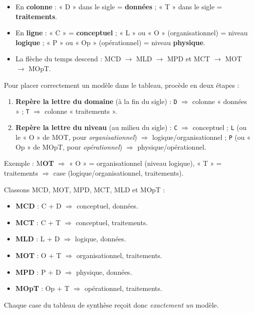 \documentclass[11pt]{article}
\begin{document}
\begin{aretenir}
\begin{itemize}
\item En \textbf{colonne} : « D » dans le sigle = \textbf{données} ; « T » dans le sigle = \textbf{traitements}.
\item En \textbf{ligne} : « C » = \textbf{conceptuel} ; « L » ou « O » (organisationnel) = niveau \textbf{logique} ; « P » ou « Op » (opérationnel) = niveau \textbf{physique}.
\item La flèche du temps descend : MCD $\rightarrow$ MLD $\rightarrow$ MPD et MCT $\rightarrow$ MOT $\rightarrow$ MOpT.
\end{itemize}
\end{aretenir}

\begin{methode}
Pour placer correctement un modèle dans le tableau, procède en deux étapes :
\begin{enumerate}
\item \textbf{Repère la lettre du domaine} (à la fin du sigle) : \texttt{D} $\Rightarrow$ colonne « données » ; \texttt{T} $\Rightarrow$ colonne « traitements ».
\item \textbf{Repère la lettre du niveau} (au milieu du sigle) : \texttt{C} $\Rightarrow$ conceptuel ; \texttt{L} (ou le « O » de MOT, pour \emph{organisationnel}) $\Rightarrow$ logique/organisationnel ; \texttt{P} (ou « Op » de MOpT, pour \emph{opérationnel}) $\Rightarrow$ physique/opérationnel.
\end{enumerate}
Exemple : M\textbf{O}\textbf{T} $\Rightarrow$ « O » = organisationnel (niveau logique), « T » = traitements $\Rightarrow$ case (logique/organisationnel, traitements).
\end{methode}

\begin{exemplebox}
Classons MCD, MOT, MPD, MCT, MLD et MOpT :
\begin{itemize}
\item \textbf{MCD} : C + D $\Rightarrow$ conceptuel, données.
\item \textbf{MCT} : C + T $\Rightarrow$ conceptuel, traitements.
\item \textbf{MLD} : L + D $\Rightarrow$ logique, données.
\item \textbf{MOT} : O + T $\Rightarrow$ organisationnel, traitements.
\item \textbf{MPD} : P + D $\Rightarrow$ physique, données.
\item \textbf{MOpT} : Op + T $\Rightarrow$ opérationnel, traitements.
\end{itemize}
Chaque case du tableau de synthèse reçoit donc \emph{exactement un} modèle.
\end{exemplebox}
\end{document}
